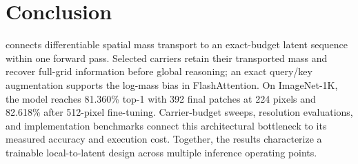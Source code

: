 \section{Conclusion}

\mn{} connects differentiable spatial mass transport to an exact-budget
latent sequence within one forward pass. Selected carriers retain their
transported mass and recover full-grid information before global reasoning;
an exact query/key augmentation supports the log-mass bias in FlashAttention.
On ImageNet-1K, the model reaches 81.360\% top-1 with 392 final patches
at 224 pixels and 82.618\% after 512-pixel fine-tuning.
Carrier-budget sweeps, resolution evaluations, and implementation
benchmarks connect this architectural bottleneck to its measured accuracy
and execution cost. Together, the results characterize a trainable
local-to-latent design across multiple inference operating points.
